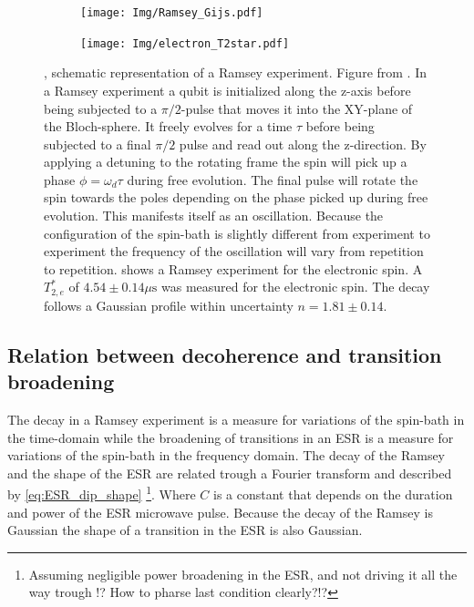 \begin{figure}[htbp]
    \centering
    \begin{subfigure}[t]{0.49\textwidth}\centering
        \caption{}
        \texttt{[image: Img/Ramsey\_Gijs.pdf]}
        \label{fig:Ramsey_gijs}
    \end{subfigure}
    \begin{subfigure}[t]{0.49\textwidth}\centering
        \caption{}
        \texttt{[image: Img/electron\_T2star.pdf]}
        \label{fig:electron_T2*}
    \end{subfigure}
        \caption{
        , schematic representation of a Ramsey experiment. Figure from \citet{Lange2012Quantum}.
        In a Ramsey experiment a qubit is initialized along the z-axis before being subjected to a $\pi/2$-pulse that moves it into the XY-plane of the Bloch-sphere.
        It freely evolves for a time $\tau$ before being subjected to a final $\pi/2$ pulse and read out along the z-direction.
        By applying a detuning to the rotating frame the spin will pick up a phase $\phi = \omega_d \tau$ during free evolution.
        The final pulse will rotate the spin towards the poles depending on the phase picked up during free evolution.
        This manifests itself as an oscillation.
        Because the configuration of the spin-bath is slightly different from experiment to experiment the frequency of the oscillation will vary from repetition to repetition.
         shows a Ramsey experiment for the electronic spin.
        A $T_{2,e}^*$ of $4.54 \pm 0.14 \mu\mathrm{s}$ was measured for the electronic spin. The decay follows a Gaussian profile within uncertainty $n = 1.81 \pm 0.14$. }
\end{figure}


\subsection{Relation between decoherence and transition broadening}
The decay in a Ramsey experiment is a measure for variations of the spin-bath in the time-domain while the broadening of transitions in an ESR is a measure for variations of the spin-bath in the frequency domain.
The decay of the Ramsey and the shape of the ESR are related trough a Fourier transform and described by \cref{eq:ESR_dip_shape} \footnote{Assuming negligible power broadening in the ESR, and not driving it all the way trough !? How to pharse last condition clearly?!? }.
Where $C$ is a constant that depends on the duration and power of the ESR microwave pulse.
Because the decay of the Ramsey is Gaussian the shape of a transition in the ESR is also Gaussian.

